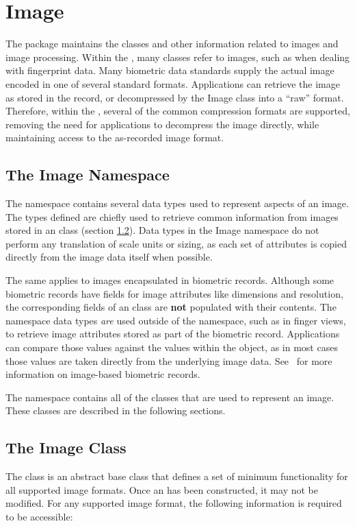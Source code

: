 %
%
\chapter{Image}
\label{chp-image}

The  package maintains the classes and other information related to images
and image processing. Within the \lname, many classes refer to images, such as
when dealing with fingerprint data. Many biometric data standards supply the
actual image encoded in one of several standard formats. Applications can
retrieve the image as stored in the record, or decompressed by the Image class
into a ``raw'' format. Therefore, within the \sname, several of the common
compression formats are supported, removing the need for applications to
decompress the image directly, while maintaining access to the as-recorded
image format.

\section{The Image Namespace}
\label{sec-imagenamespace}
The  namespace contains several data types used to represent
aspects of an image.  The types defined are chiefly used to retrieve common
information from images stored in an  class (section
\ref{sec-imageclass}).  Data types in the Image namespace do not perform
any translation of scale units or sizing, as each set of attributes is copied 
directly from the image data itself when possible.

The same applies to images encapsulated in biometric records.  Although some 
biometric records have fields for image attributes like dimensions and 
resolution, the corresponding fields of an  class are {\bf not} populated 
with their contents.  The  namespace data types {\em are} used outside of 
the  namespace, such as in finger views, to retrieve image attributes stored as 
part of the biometric record.  Applications can compare those values against 
the values within the  object, as in most cases those values are taken 
directly from the underlying image data.  See~ for more 
information on image-based biometric records.

The  namespace contains all of the  classes that are used to
represent an image. These classes are described in the following sections.

\section{The Image Class}
\label{sec-imageclass}
The  class is an abstract base class that defines a set of minimum 
functionality for all supported image formats.  Once an  has been 
constructed, it may not be modified.  For any supported image format, the 
following information is required to be accessible:

